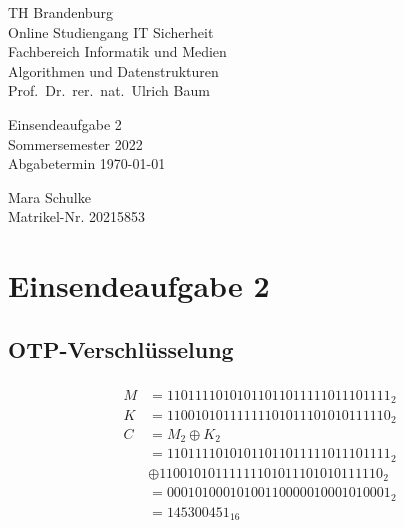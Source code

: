\documentclass{article}
\begin{document}
\begin{titlepage}
	\begin{flushleft}
		TH Brandenburg\\
		Online Studiengang IT Sicherheit\\
		Fachbereich Informatik und Medien\\
		Algorithmen und Datenstrukturen\\
		Prof.\ Dr.\ rer.\ nat.\ Ulrich Baum
	\end{flushleft}

	\vfill

	\begin{center}
		\Large{Einsendeaufgabe 2}\\[0.5em]
		\large{Sommersemester 2022}\\[0.25em]
		\large{Abgabetermin \today}
	\end{center}

	\vfill

	\begin{flushright}
		Mara Schulke \\
		Matrikel-Nr. 20215853
	\end{flushright}
\end{titlepage}

\newpage

\section*{Einsendeaufgabe 2}

\subsection{OTP-Verschlüsselung}

\subsubsection{}

\begin{align*}
	  M & = 1101 1110 1010 1101 1011 1110 1110 1111_2\\
	  K & = 1100 1010 1111 1110 1011 1010 1011 1110_2\\
	  C & = M_2 \oplus K_2\\
		& = 1101 1110 1010 1101 1011 1110 1110 1111_2\\
		& \oplus 1100 1010 1111 1110 1011 1010 1011 1110_2\\
		& = 0001 0100 0101 0011 0000 0100 0101 0001_2\\
		& = 145300451_{16}
\end{align*}
\end{document}
